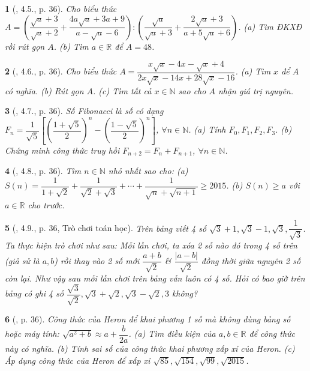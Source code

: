 \documentclass{article}
\newtheorem{baitoan}{}%
\begin{document}
\begin{baitoan}[\cite{Binh_boi_duong_Toan_9_tap_1}, 4.5., p. 36]
	Cho biểu thức $A = \left(\dfrac{\sqrt{a} + 3}{\sqrt{a} + 2} + \dfrac{4a\sqrt{a} + 3a + 9}{a - \sqrt{a} - 6}\right):\left(\dfrac{\sqrt{a}}{\sqrt{a} + 3} + \dfrac{2\sqrt{a} + 3}{a + 5\sqrt{a} + 6}\right)$. (a) Tìm {\rm ĐKXĐ} rồi rút gọn $A$. (b) Tìm $a\in\mathbb{R}$ để $A = 48$.
\end{baitoan}

\begin{baitoan}[\cite{Binh_boi_duong_Toan_9_tap_1}, 4.6., p. 36]
	Cho biểu thức $A = \dfrac{x\sqrt{x} - 4x - \sqrt{x} + 4}{2x\sqrt{x} - 14x + 28\sqrt{x} - 16}$. (a) Tìm $x$ để $A$ có nghĩa. (b) Rút gọn $A$. (c) Tìm tất cả $x\in\mathbb{N}$ sao cho $A$ nhận giá trị nguyên.
\end{baitoan}

\begin{baitoan}[\cite{Binh_boi_duong_Toan_9_tap_1}, 4.7., p. 36]
	Số Fibonacci là số có dạng $F_n = \dfrac{1}{\sqrt{5}}\left[\left(\dfrac{1 + \sqrt{5}}{2}\right)^n - \left(\dfrac{1 - \sqrt{5}}{2}\right)^n\right]$, $\forall n\in\mathbb{N}$. (a) Tính $F_0,F_1,F_2,F_3$. (b) Chứng minh công thức truy hồi $F_{n + 2} = F_n + F_{n + 1}$, $\forall n\in\mathbb{N}$.
\end{baitoan}

\begin{baitoan}[\cite{Binh_boi_duong_Toan_9_tap_1}, 4.8., p. 36]
	Tìm $n\in\mathbb{N}$ nhỏ nhất sao cho: (a) $S(n) = \dfrac{1}{1 + \sqrt{2}} + \dfrac{1}{\sqrt{2} + \sqrt{3}} + \cdots + \dfrac{1}{\sqrt{n} + \sqrt{n + 1}}\ge2015$. (b) $S(n)\ge a$ với $a\in\mathbb{R}$ cho trước.
\end{baitoan}

\begin{baitoan}[\cite{Binh_boi_duong_Toan_9_tap_1}, 4.9., p. 36, Trò chơi toán học]
	Trên bảng viết 4 số $\sqrt{3} + 1,\sqrt{3} - 1,\sqrt{3},\dfrac{1}{\sqrt{3}}$. Ta thực hiện trò chơi như sau: Mỗi lần chơi, ta xóa 2 số nào đó trong 4 số trên (giả sử là $a,b$) rồi thay vào 2 số mới $\dfrac{a + b}{\sqrt{2}}$ \& $\dfrac{|a - b|}{\sqrt{2}}$ đồng thời giữa nguyên 2 số còn lại. Như vậy sau mỗi lần chơi trên bảng vẫn luôn có 4 số. Hỏi có bao giờ trên bảng có ghi 4 số $\dfrac{\sqrt{3}}{\sqrt{2}},\sqrt{3} + \sqrt{2},\sqrt{3} - \sqrt{2},3$ không?
\end{baitoan}

\begin{baitoan}[\cite{Binh_boi_duong_Toan_9_tap_1}, p. 36]
	Công thức của Heron để khai phương 1 số mà không dùng bảng số hoặc máy tính: $\sqrt{a^2 + b}\approx a + \dfrac{b}{2a}$. (a) Tìm điều kiện của $a,b\in\mathbb{R}$ để công thức này có nghĩa. (b) Tính sai số của công thức khai phương xấp xỉ của Heron. (c) Áp dụng công thức của Heron để xấp xỉ $\sqrt{85},\sqrt{154},\sqrt{99},\sqrt{2015}$.
\end{baitoan}
\end{document}
